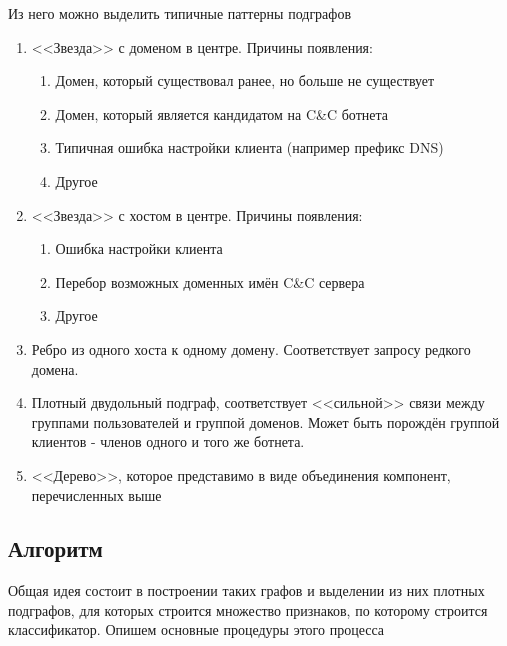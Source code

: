 \documentclass[14pt]{extreport}
\begin{document}
	
	Из него можно выделить типичные паттерны подграфов
	\begin{enumerate}
	\item <<Звезда>> с доменом в центре. Причины появления:
	\begin{enumerate}
	\item Домен, который существовал ранее, но больше не существует
	\item Домен, который является кандидатом на C\&C ботнета
	\item Типичная ошибка настройки клиента (например префикс DNS)
	\item Другое
	\end{enumerate}
	\item <<Звезда>> с хостом в центре. Причины появления:
	\begin{enumerate}
	\item Ошибка настройки клиента
	\item Перебор возможных доменных имён C\&C сервера
	\item Другое
	\end{enumerate}
	
	\item Ребро из одного хоста к одному домену. Соответствует запросу редкого домена.
	
	\item Плотный двудольный подграф, соответствует <<сильной>> связи между группами пользователей и группой доменов. Может быть порождён группой клиентов - членов одного и того же ботнета.
	
	\item <<Дерево>>, которое представимо в виде объединения компонент, перечисленных выше
	\end{enumerate}
	
	\subsection{Алгоритм}
	Общая идея состоит в построении таких графов и выделении из них плотных подграфов, для которых строится множество признаков, по которому строится классификатор. Опишем основные процедуры этого процесса
	
\end{document}
